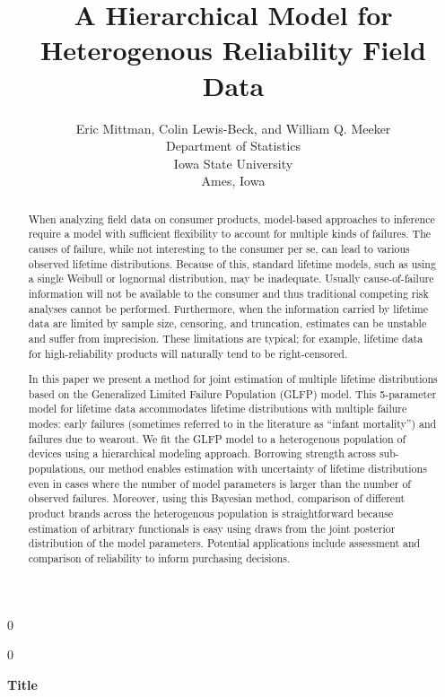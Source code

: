 \documentclass[11pt]{article}
\newcommand{\blind}{0}
\begin{document}
\def\spacingset#1{\renewcommand{\baselinestretch}%
{#1}\small\normalsize} \spacingset{1}



\blind
{
  \title{\bf A Hierarchical Model for Heterogenous Reliability Field Data}
  \author{Eric Mittman, Colin Lewis-Beck, and William Q. Meeker\\
  Department of Statistics\\
  Iowa State University\\
  Ames, Iowa}
  \maketitle
} \fi

\blind
{
  \bigskip
  \bigskip
  \bigskip
  \begin{center}
    {\LARGE\bf Title}
\end{center}
  \medskip
} \fi

\begin{abstract}
When analyzing field data on consumer products, model-based approaches to inference require a model with sufficient flexibility to account for multiple kinds of failures. The causes of failure, while not interesting to the consumer per se, can lead to various observed lifetime distributions.  Because of this, standard lifetime models, such as using a single Weibull or
lognormal distribution, may be inadequate. Usually cause-of-failure information will not be available to the consumer and thus traditional competing risk analyses cannot be performed.
Furthermore, when the information carried by lifetime data are limited by sample size, censoring, and truncation, estimates can be unstable and suffer from imprecision. These limitations are typical; for example, lifetime data for high-reliability products will naturally tend to be right-censored.


In this paper we present a method for joint estimation of multiple lifetime distributions based on the Generalized Limited Failure Population (GLFP) model. This 5-parameter model for lifetime data accommodates lifetime distributions with multiple failure modes:  early failures (sometimes referred to in the literature as ``infant mortality'') and failures due to wearout. We fit the GLFP model to a heterogenous population of devices using a hierarchical modeling approach.  Borrowing strength across sub-populations, our method enables estimation with uncertainty of lifetime distributions even in cases where the number of model parameters is larger than the number of observed failures.  Moreover, using this Bayesian method, comparison of different product brands across the heterogenous population is straightforward because estimation of arbitrary functionals is easy using draws from the joint posterior distribution of the model parameters. Potential applications include assessment and comparison of reliability to inform purchasing decisions.

\end{abstract}
\end{document}
